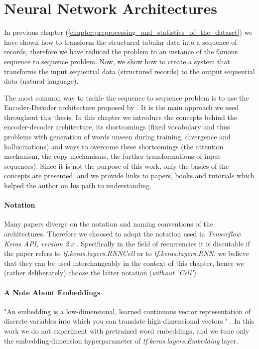 \chapter{Neural Network Architectures} \label{chapter:neural_network_architectures}
In previous chapter (\ref{chapter:preprocessing_and_statistics_of_the_dataset}) we have shown how to transform the structured tabular data into a sequence of records, therefore we have reduced the problem to an instance of the famous sequence to sequence problem. Now, we show how to create a system that transforms the input sequential data (structured records) to the output sequential data (natural language).

The most common way to tackle the sequence to sequence problem is to use the Encoder-Decoder architecture proposed by \citet{sutskever2014sequence}. It is the main approach we used throughout this thesis. In this chapter we introduce the concepts behind the encoder-decoder architecture, its shortcomings (fixed vocabulary and thus problems with generation of words unseen during training, divergence and hallucinations) and ways to overcome these shortcomings (the attention mechanism, the copy mechanisms, the further transformations of input sequences). Since it is not the purpose of this work, only the basics of the concepts are presented, and we provide links to papers, books and tutorials which helped the author on his path to understanding.

\subsubsection{Notation}
Many papers diverge on the notation and naming conventions of the architectures. Therefore we choosed to adopt the notation used in \emph{Tensorflow Keras API, version 2.x} \citep{tensorflow2015-whitepaper}. Specifically in the field of recurrencies it is discutable if the paper refers to \emph{tf.keras.layers.RNNCell} or to \emph{tf.keras.layers.RNN}. we believe that they can be used interchangeably in the context of this chapter, hence we (rather deliberately) choose the latter notation (\emph{without 'Cell'}).

\subsubsection{A Note About Embeddings} \label{subsection:embeddings}

"An embedding is a low-dimensional, learned continuous vector representation of discrete variables into which you can translate high-dimensional vectors." \citep{embeddingDefinition}. In this work we do not experiment with pretrained word embeddings, and we tune only the embedding-dimension hyperparameter of \emph{tf.keras.layers.Em\-bedding} layer.

